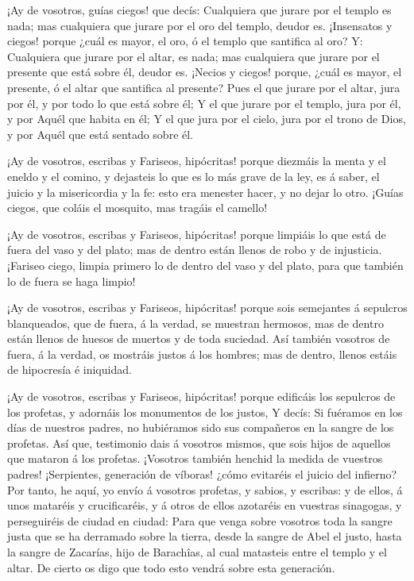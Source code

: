  ¡Ay de vosotros, guías ciegos! que decís: Cualquiera que
jurare por el templo es nada; mas cualquiera que jurare por el oro del
templo, deudor es.  ¡Insensatos y ciegos! porque ¿cuál es
mayor, el oro, ó el templo que santifica al oro?  Y:
Cualquiera que jurare por el altar, es nada; mas cualquiera que jurare
por el presente que está sobre él, deudor es.  ¡Necios y
ciegos! porque, ¿cuál es mayor, el presente, ó el altar que santifica al
presente?  Pues el que jurare por el altar, jura por él, y
por todo lo que está sobre él;  Y el que jurare por el
templo, jura por él, y por Aquél que habita en él;  Y el
que jura por el cielo, jura por el trono de Dios, y por Aquél que está
sentado sobre él.

 ¡Ay de vosotros, escribas y Fariseos, hipócritas! porque
diezmáis la menta y el eneldo y el comino, y dejasteis lo que es lo más
grave de la ley, es á saber, el juicio y la misericordia y la fe: esto
era menester hacer, y no dejar lo otro.  ¡Guías ciegos, que
coláis el mosquito, mas tragáis el camello!

 ¡Ay de vosotros, escribas y Fariseos, hipócritas! porque
limpiáis lo que está de fuera del vaso y del plato; mas de dentro están
llenos de robo y de injusticia.  ¡Fariseo ciego, limpia
primero lo de dentro del vaso y del plato, para que también lo de fuera
se haga limpio!

 ¡Ay de vosotros, escribas y Fariseos, hipócritas! porque
sois semejantes á sepulcros blanqueados, que de fuera, á la verdad, se
muestran hermosos, mas de dentro están llenos de huesos de muertos y de
toda suciedad.  Así también vosotros de fuera, á la verdad,
os mostráis justos á los hombres; mas de dentro, llenos estáis de
hipocresía é iniquidad.

 ¡Ay de vosotros, escribas y Fariseos, hipócritas! porque
edificáis los sepulcros de los profetas, y adornáis los monumentos de
los justos,  Y decís: Si fuéramos en los días de nuestros
padres, no hubiéramos sido sus compañeros en la sangre de los profetas.
 Así que, testimonio dais á vosotros mismos, que sois hijos
de aquellos que mataron á los profetas.  ¡Vosotros también
henchid la medida de vuestros padres!  ¡Serpientes,
generación de víboras! ¿cómo evitaréis el juicio del infierno?
 Por tanto, he aquí, yo envío á vosotros profetas, y
sabios, y escribas: y de ellos, á unos mataréis y crucificaréis, y á
otros de ellos azotaréis en vuestras sinagogas, y perseguiréis de ciudad
en ciudad:  Para que venga sobre vosotros toda la sangre
justa que se ha derramado sobre la tierra, desde la sangre de Abel el
justo, hasta la sangre de Zacarías, hijo de Barachîas, al cual matasteis
entre el templo y el altar.  De cierto os digo que todo
esto vendrá sobre esta generación.

